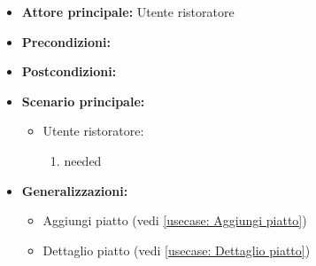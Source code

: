 \label{usecase:Menu ristorante}
\begin{itemize}
\item \textbf{Attore principale:}  Utente ristoratore
\item \textbf{Precondizioni:}
\item \textbf{Postcondizioni:}
\item \textbf{Scenario principale:}
\begin{itemize}
\item  Utente ristoratore:
\begin{enumerate}
\item needed
\end{enumerate}
\end{itemize}
\item \textbf{Generalizzazioni:}
\begin{itemize}
\item  Aggiungi piatto (vedi \autoref{usecase: Aggiungi piatto})
\item  Dettaglio piatto (vedi \autoref{usecase: Dettaglio piatto})
\end{itemize}
\end{itemize}